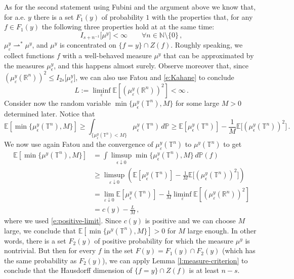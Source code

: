 \documentclass[11pt,reqno]{amsart}
\newcommand{\T}{{\mathbb T}}
\newcommand{\E}{{\mathbb E}}
\theoremstyle{definition}
\numberwithin{equation}{section}
\begin{document}
\medskip

As for the second statement using Fubini and the argument above we know that, for a.e. $y$ there is a set $F_1(y)$ of probability $1$ with the properties that, for any $f\in F_1(y)$ the following three properties hold at at the same time:
\[
I_{s+n^{-1}} \bigl[\mu^y\bigr] < \infty \qquad \forall n \in \mathbb N\setminus \{0\}\, ,
\]
$\mu^y_\varepsilon \rightharpoonup^* \mu^y$, and $\mu^y$ is concentrated on $\{f=y\}\cap Z(f)$. Roughly speaking, we collect functions $f$ with a well-behaved measure $\mu^y$ that can be approximated by the measures $\mu^y_\epsilon$, and this happens almost surely.
Observe moreover that, since $(\mu^y_\varepsilon (\mathbb R^n))^2 \leq  I_{2s} \bigl[\mu^y_\varepsilon \bigr]$, we can also use Fatou and \eqref{e:Kahane} to conclude
\[
L:= \liminf_\varepsilon \mathbb E \left[ (\mu^y_\varepsilon (\mathbb R^n))^2\right]
< \infty\, .
\]
Consider now the random variable $\min\{\mu^y_{\epsilon}(\T^n),M\}$ for some large $M>0$ determined later. Notice that
\[
\E \left[\min\{\mu^y_\epsilon(\T^n),M\}\right]\ge \int_{\{\mu^y_\epsilon(\T^n)<M\}}\mu^y_\epsilon(\T^n)\,d\mathbb P\ge \E[\mu^y_\epsilon(\T^n)]-\frac{1}{M}\E\bigl[(\mu^y_\epsilon (\mathbb T^n))^2\bigr]\, .
\]
We now use again Fatou and the convergence of $\mu^y_\varepsilon (\mathbb T^n)$ to $\mu^y (\mathbb T^n)$ to get
\begin{align*}
\E \left[\min\{\mu^y(\T^n),M\}\right]
& =\int \limsup_{\epsilon\downarrow0}\min\{\mu^y_\epsilon(\T^n),M\}\, d\mathbb P (f)\\
&\geq \limsup_{\varepsilon \downarrow 0} \left(\E[\mu^y_\epsilon(\T^n)]-\frac{1}{M}\E\bigl[(\mu^y_\epsilon (\mathbb T^n))^2\bigr]\right)\\
& = \lim_{\varepsilon\downarrow 0} \E[\mu^y_\epsilon(\T^n)] -
\frac{1}{M}  \liminf_\varepsilon \mathbb E \left[ (\mu^y_\varepsilon (\mathbb R^n))^2\right]\\
&= c(y) - \frac{L}{M}\, ,
\end{align*}
where we used \eqref{e:positive-limit}. Since $c(y)$ is positive and we can choose $M$ large, we conclude that $\E \left[\min\{\mu^y(\T^n),M\}\right] >0$ for $M$ large enough. In other words, there is a set $F_2(y)$ of positive probability for which the measure $\mu^y$ is nontrivial. But then for every $f$ in the set $F(y) = F_1(y) \cap F_2(y)$ (which has the same probability as $F_2(y)$), we can apply Lemma \ref{l:measure-criterion} to conclude that the Hausdorff dimension of $\{f=y\}\cap Z(f)$ is at least $n-s$. 
\end{document}
